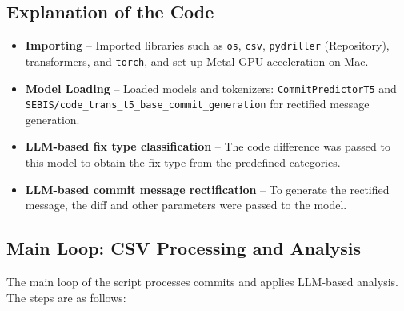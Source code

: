 \documentclass[12pt,a4paper]{article}
\begin{document}
\FloatBarrier  %

\subsection*{Explanation of the Code}

\begin{itemize}
    \item \textbf{Importing} -- Imported libraries such as \texttt{os}, \texttt{csv}, \texttt{pydriller} (Repository), transformers, and \texttt{torch}, and set up Metal GPU acceleration on Mac.
    \item \textbf{Model Loading} -- Loaded models and tokenizers: \texttt{CommitPredictorT5} and \texttt{SEBIS/code\_trans\_t5\_base\_commit\_generation} for rectified message generation.
    \item \textbf{LLM-based fix type classification} -- The code difference was passed to this model to obtain the fix type from the predefined categories.
    \item \textbf{LLM-based commit message rectification} -- To generate the rectified message, the diff and other parameters were passed to the model.
\end{itemize}

    \subsection{Main Loop: CSV Processing and Analysis}
        The main loop of the script processes commits and applies LLM-based analysis. The steps are as follows:
\end{document}
